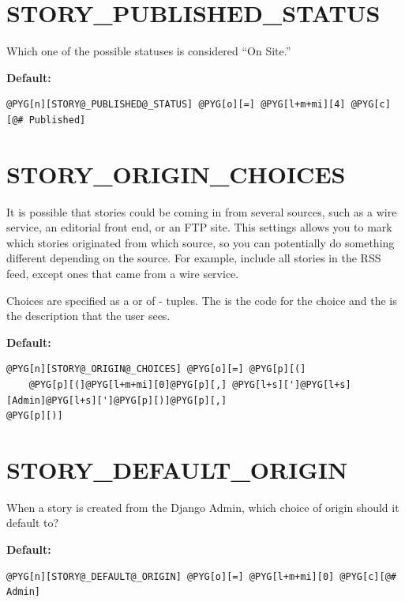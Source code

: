 \documentclass[letterpaper,10pt,english]{manual}
\begin{document}
\section{STORY\_PUBLISHED\_STATUS}

Which one of the possible statuses is considered ``On Site.''

\textbf{Default:}

\begin{Verbatim}[commandchars=@\[\]]
@PYG[n][STORY@_PUBLISHED@_STATUS] @PYG[o][=] @PYG[l+m+mi][4] @PYG[c][@# Published]
\end{Verbatim}
\hypertarget{story-origin-choices}{}

\section{STORY\_ORIGIN\_CHOICES}

It is possible that stories could be coming in from several sources, such as a wire service, an editorial front end, or an FTP site. This settings allows you to mark which stories originated from which source, so you can potentially do something different depending on the source. For example, include all stories in the RSS feed, except ones that came from a wire service.

Choices are specified as a  or  of  -  tuples. The  is the code for the choice and the  is the description that the user sees.

\textbf{Default:}

\begin{Verbatim}[commandchars=@\[\]]
@PYG[n][STORY@_ORIGIN@_CHOICES] @PYG[o][=] @PYG[p][(]
    @PYG[p][(]@PYG[l+m+mi][0]@PYG[p][,] @PYG[l+s][']@PYG[l+s][Admin]@PYG[l+s][']@PYG[p][)]@PYG[p][,]
@PYG[p][)]
\end{Verbatim}
\hypertarget{story-default-origin}{}

\section{STORY\_DEFAULT\_ORIGIN}

When a story is created from the Django Admin, which choice of origin should it default to?

\textbf{Default:}

\begin{Verbatim}[commandchars=@\[\]]
@PYG[n][STORY@_DEFAULT@_ORIGIN] @PYG[o][=] @PYG[l+m+mi][0] @PYG[c][@# Admin]
\end{Verbatim}
\hypertarget{story-include-print}{}
\end{document}
